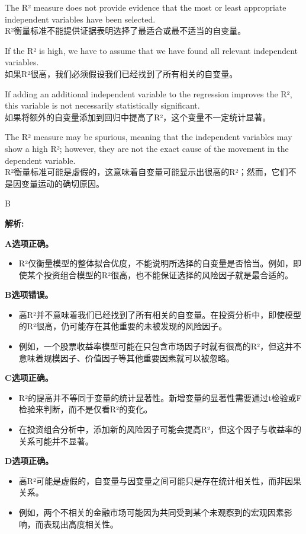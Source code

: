 \documentclass{article}
\newenvironment{explanation}
{\textbf{解析:}\par}
{\par}
\begin{document}
\begin{choices}
    \item The R² measure does not provide evidence that the most or least appropriate independent variables have been selected.\\
    R²衡量标准不能提供证据表明选择了最适合或最不适当的自变量。
    \item If the R² is high, we have to assume that we have found all relevant independent variables.\\
    如果R²很高，我们必须假设我们已经找到了所有相关的自变量。
    \item If adding an additional independent variable to the regression improves the R², this variable is not necessarily statistically significant.\\
    如果将额外的自变量添加到回归中提高了R²，这个变量不一定统计显著。
    \item The R² measure may be spurious, meaning that the independent variables may show a high R²; however, they are not the exact cause of the movement in the dependent variable.\\
    R²衡量标准可能是虚假的，这意味着自变量可能显示出很高的R²；然而，它们不是因变量运动的确切原因。
\end{choices}

\begin{correctanswer}
B
\end{correctanswer}

\begin{explanation}
\textbf{A选项正确。}
\begin{itemize}
    \item R²仅衡量模型的整体拟合优度，不能说明所选择的自变量是否恰当。例如，即使某个投资组合模型的R²很高，也不能保证选择的风险因子就是最合适的。
\end{itemize}

\textbf{B选项错误。}
\begin{itemize}
    \item 高R²并不意味着我们已经找到了所有相关的自变量。在投资分析中，即使模型的R²很高，仍可能存在其他重要的未被发现的风险因子。
    \item 例如，一个股票收益率模型可能在只包含市场因子时就有很高的R²，但这并不意味着规模因子、价值因子等其他重要因素就可以被忽略。
\end{itemize}

\textbf{C选项正确。}
\begin{itemize}
    \item R²的提高并不等同于变量的统计显著性。新增变量的显著性需要通过t检验或F检验来判断，而不是仅看R²的变化。
    \item 在投资组合分析中，添加新的风险因子可能会提高R²，但这个因子与收益率的关系可能并不显著。
\end{itemize}

\textbf{D选项正确。}
\begin{itemize}
    \item 高R²可能是虚假的，自变量与因变量之间可能只是存在统计相关性，而非因果关系。
    \item 例如，两个不相关的金融市场可能因为共同受到某个未观察到的宏观因素影响，而表现出高度相关性。
\end{itemize}
\end{explanation}
\end{document}
